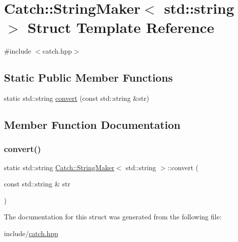 \hypertarget{struct_catch_1_1_string_maker_3_01std_1_1string_01_4}{}\section{Catch\+::String\+Maker$<$ std\+::string $>$ Struct Template Reference}
\label{struct_catch_1_1_string_maker_3_01std_1_1string_01_4}


{\ttfamily \#include $<$catch.\+hpp$>$}

\subsection*{Static Public Member Functions}
\begin{DoxyCompactItemize}
\item 
static std\+::string \mbox{\hyperlink{struct_catch_1_1_string_maker_3_01std_1_1string_01_4_ae065b2ecc5c1a6c4409cf06d604bd66d}{convert}} (const std\+::string \&str)
\end{DoxyCompactItemize}


\subsection{Member Function Documentation}
\mbox{\label{struct_catch_1_1_string_maker_3_01std_1_1string_01_4_ae065b2ecc5c1a6c4409cf06d604bd66d}} 
\subsubsection{\texorpdfstring{convert()}{convert()}}
{\footnotesize\ttfamily static std\+::string \mbox{\hyperlink{struct_catch_1_1_string_maker}{Catch\+::\+String\+Maker}}$<$ std\+::string $>$\+::convert (\begin{DoxyParamCaption}\item[{const std\+::string \&}]{str }\end{DoxyParamCaption})\hspace{0.3cm}{\ttfamily [static]}}



The documentation for this struct was generated from the following file\+:\begin{DoxyCompactItemize}
\item 
include/\mbox{\hyperlink{catch_8hpp}{catch.\+hpp}}\end{DoxyCompactItemize}
